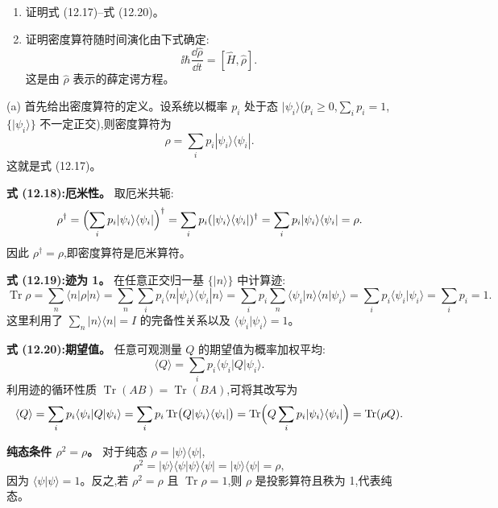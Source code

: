 \begin{question}
\begin{enumerate}
\item 证明式 (12.17)--式 (12.20)。
\item 证明密度算符随时间演化由下式确定:
\[
\ii\hbar\frac{\dd\hat\rho}{\dd t}=[\hat H,\hat\rho].
\]
这是由 $\hat\rho$ 表示的薛定谔方程。
\end{enumerate}

\par\smallskip
{}

\begin{solution}
(a) 首先给出密度算符的定义。设系统以概率 $p_i$ 处于态 $|\psi_i\rangle$($p_i\ge0$,$\sum_i p_i=1$,$\{|\psi_i\rangle\}$ 不一定正交),则密度算符为
\[
\rho = \sum_i p_i |\psi_i\rangle\langle\psi_i|.
\]
这就是式 (12.17)。

\textbf{式 (12.18):厄米性。}
取厄米共轭:
\[
\rho^\dagger = \Bigl(\sum_i p_i |\psi_i\rangle\langle\psi_i|\Bigr)^\dagger
= \sum_i p_i (|\psi_i\rangle\langle\psi_i|)^\dagger
= \sum_i p_i |\psi_i\rangle\langle\psi_i| = \rho.
\]
因此 $\rho^\dagger = \rho$,即密度算符是厄米算符。

\textbf{式 (12.19):迹为 1。}
在任意正交归一基 $\{|n\rangle\}$ 中计算迹:
\[
\operatorname{Tr}\rho = \sum_n \langle n|\rho|n\rangle
= \sum_n \sum_i p_i \langle n|\psi_i\rangle\langle\psi_i|n\rangle
= \sum_i p_i \sum_n \langle\psi_i|n\rangle\langle n|\psi_i\rangle
= \sum_i p_i \langle\psi_i|\psi_i\rangle = \sum_i p_i = 1.
\]
这里利用了 $\sum_n |n\rangle\langle n| = I$ 的完备性关系以及 $\langle\psi_i|\psi_i\rangle=1$。

\textbf{式 (12.20):期望值。}
任意可观测量 $Q$ 的期望值为概率加权平均:
\[
\langle Q\rangle = \sum_i p_i \langle\psi_i|Q|\psi_i\rangle.
\]
利用迹的循环性质 $\operatorname{Tr}(AB)=\operatorname{Tr}(BA)$,可将其改写为
\[
\langle Q\rangle = \sum_i p_i \langle\psi_i|Q|\psi_i\rangle
= \sum_i p_i \operatorname{Tr}\bigl(Q|\psi_i\rangle\langle\psi_i|\bigr)
= \operatorname{Tr}\Bigl(Q\sum_i p_i|\psi_i\rangle\langle\psi_i|\Bigr)
= \operatorname{Tr}(\rho Q).
\]

\textbf{纯态条件 $\rho^2=\rho$。}
对于纯态 $\rho=|\psi\rangle\langle\psi|$,
\[
\rho^2 = |\psi\rangle\langle\psi|\psi\rangle\langle\psi| = |\psi\rangle\langle\psi| = \rho,
\]
因为 $\langle\psi|\psi\rangle=1$。反之,若 $\rho^2=\rho$ 且 $\operatorname{Tr}\rho=1$,则 $\rho$ 是投影算符且秩为 1,代表纯态。


\end{solution}
\end{question}
